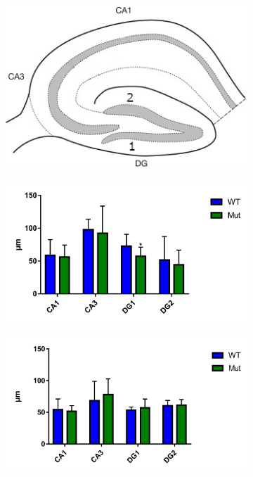 \begin{figure}[h]
\begin{subfigure}[h]{0.329\textwidth}
		\end{subfigure}
		\begin{subfigure}[h]{0.329\textwidth}
			\caption{}
			\label{fig:hippIllu}
			\includegraphics[width=\textwidth]{./Images/HippSchema.jpg}
		\end{subfigure}
		\begin{subfigure}[h]{0.329\textwidth}
			\caption{}
			\label{fig:NeunQuantifNasal}
			\includegraphics[width=\textwidth]{./Images/Immuno/NeuN/Quantif_Nasal.jpg}
		\end{subfigure}
		\begin{subfigure}[h]{0.329\textwidth}
			\caption{}
			\label{fig:NeunQuantifMilieu}
			\includegraphics[width=\textwidth]{./Images/Immuno/NeuN/Quantif_Milieu.jpg}

\end{subfigure}
\end{figure}
